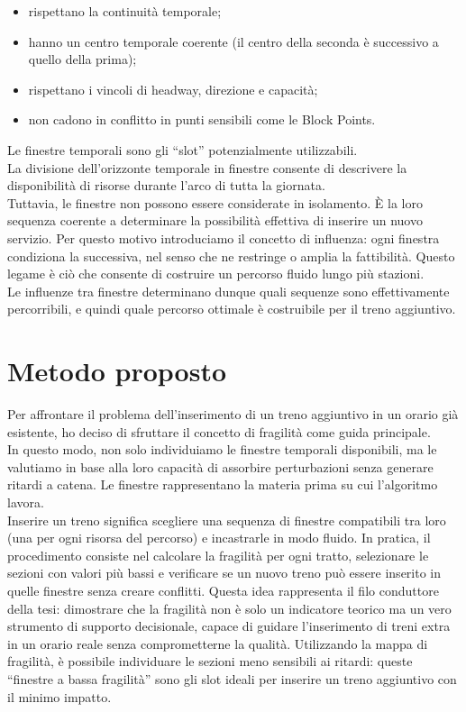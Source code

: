 \documentclass[a4paper,12pt]{report}
\begin{document}
\begin{itemize}
    \item rispettano la continuità temporale;


    \item hanno un centro temporale coerente (il centro della seconda è successivo a quello della prima);

    \item rispettano i vincoli di headway, direzione e capacità;

     \item non cadono in conflitto in punti sensibili come le Block Points.

  \end{itemize}
Le finestre temporali sono gli “slot” potenzialmente utilizzabili. \\ La divisione dell’orizzonte temporale in finestre consente di descrivere la disponibilità di risorse durante l'arco di tutta la giornata. \\ 
Tuttavia, le finestre non possono essere considerate in isolamento. È la loro sequenza coerente a determinare la possibilità effettiva di inserire un nuovo servizio. Per questo motivo introduciamo il concetto di influenza: ogni finestra condiziona la successiva, nel senso che ne restringe o amplia la fattibilità. Questo legame è ciò che consente di costruire un percorso fluido lungo più stazioni. \\ Le influenze tra finestre determinano dunque quali sequenze sono effettivamente percorribili, e quindi quale percorso ottimale è costruibile per il treno aggiuntivo.


\section{Metodo proposto}
Per affrontare il problema dell’inserimento di un treno aggiuntivo in un orario già esistente, ho deciso di sfruttare il concetto di fragilità come guida principale. \\ In questo modo, non solo individuiamo le finestre temporali disponibili, ma le valutiamo in base alla loro capacità di assorbire perturbazioni senza generare ritardi a catena.
Le finestre rappresentano la materia prima su cui l’algoritmo lavora. \\ Inserire un treno significa scegliere una sequenza di finestre compatibili tra loro (una per ogni risorsa del percorso) e incastrarle in modo fluido.
In pratica, il procedimento consiste nel calcolare la fragilità per ogni tratto, selezionare le sezioni con valori più bassi e verificare se un nuovo treno può essere inserito in quelle finestre senza creare conflitti. Questa idea rappresenta il filo conduttore della tesi: dimostrare che la fragilità non è solo un indicatore teorico ma un vero strumento di supporto decisionale, capace di guidare l’inserimento di treni extra in un orario reale senza comprometterne la qualità.
 Utilizzando la mappa di fragilità, è possibile individuare le sezioni meno sensibili ai ritardi: queste “finestre a bassa fragilità” sono gli slot ideali per inserire un treno aggiuntivo con il minimo impatto. 
\end{document}
